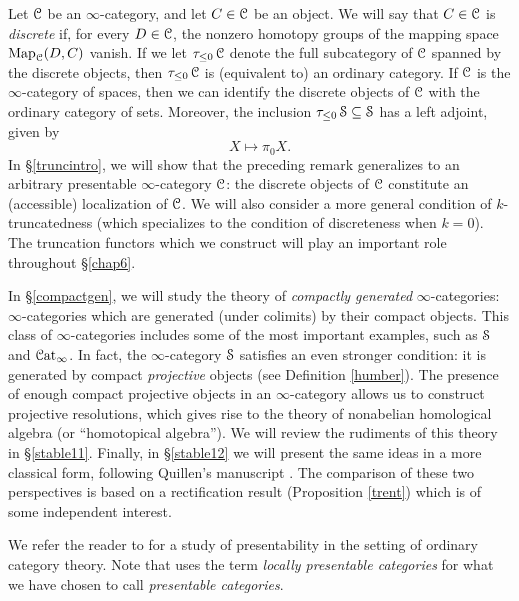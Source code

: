 Let $\operatorname{\mathcal{C}}$ be an $\infty$-category, and let $C \in \operatorname{\mathcal{C}}$ be an object. We will say that
$C \in \operatorname{\mathcal{C}}$ is {\em discrete} if, for every $D \in \operatorname{\mathcal{C}}$, the nonzero homotopy groups of the mapping space $\operatorname{{Map}}_{\operatorname{\mathcal{C}}}(D,C)$ vanish. If we let $\tau_{\leq 0} \operatorname{\mathcal{C}}$ denote the full subcategory of $\operatorname{\mathcal{C}}$ spanned by the discrete objects, then $\tau_{\leq 0} \operatorname{\mathcal{C}}$ is (equivalent to) an ordinary category. If $\operatorname{\mathcal{C}}$ is the $\infty$-category of spaces, then we can identify the discrete objects of $\operatorname{\mathcal{C}}$ with the ordinary category of sets. Moreover, the inclusion $\tau_{\leq 0} \operatorname{\mathcal{S}} \subseteq \operatorname{\mathcal{S}}$ has a left adjoint, given by
$$ X \mapsto \pi_0 X.$$
In \S \ref{truncintro}, we will show that the preceding remark generalizes to an arbitrary presentable $\infty$-category $\operatorname{\mathcal{C}}$: the discrete objects of $\operatorname{\mathcal{C}}$ constitute an (accessible) localization of $\operatorname{\mathcal{C}}$. We will also consider a more general condition of $k$-truncatedness (which specializes to the condition of discreteness when $k=0$). The truncation functors which we construct will play an important role throughout \S \ref{chap6}. 

In \S \ref{compactgen}, we will study the theory of {\em compactly generated} $\infty$-categories: $\infty$-categories which are generated (under colimits) by their compact objects. This class of $\infty$-categories includes some of the most important examples, such as $\operatorname{\mathcal{S}}$ and $\operatorname{\mathcal{C}at}_{\infty}$. 
In fact, the $\infty$-category $\operatorname{\mathcal{S}}$ satisfies an even stronger condition: it is generated by
compact {\em projective} objects (see Definition \ref{humber}). The presence of enough compact projective objects in an $\infty$-category allows us to construct projective resolutions, which gives rise to the theory of nonabelian homological algebra (or ``homotopical algebra''). We will review the rudiments of this theory in \S \ref{stable11}. Finally, in \S \ref{stable12} we will present the same ideas in a more classical form, following Quillen's manuscript \cite{homotopicalalgebra}. The comparison of these two perspectives is based on a rectification result (Proposition \ref{trent}) which is of some independent interest.

\begin{remark}
We refer the reader to \cite{adamek} for a study of presentability in the setting of ordinary
category theory. Note that \cite{adamek} uses the term {\it locally presentable categories} for what we have chosen to call {\it presentable categories}.
\end{remark}


